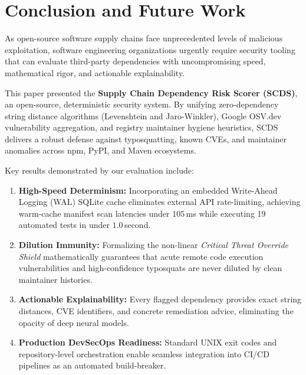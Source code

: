 \section{Conclusion and Future Work}
\label{sec:conclusion}

As open-source software supply chains face unprecedented levels of malicious exploitation, software engineering organizations urgently require security tooling that can evaluate third-party dependencies with uncompromising speed, mathematical rigor, and actionable explainability. 

This paper presented the \textbf{Supply Chain Dependency Risk Scorer (SCDS)}, an open-source, deterministic security system. By unifying zero-dependency string distance algorithms (Levenshtein and Jaro-Winkler), Google OSV.dev vulnerability aggregation, and registry maintainer hygiene heuristics, SCDS delivers a robust defense against typosquatting, known CVEs, and maintainer anomalies across npm, PyPI, and Maven ecosystems.

Key results demonstrated by our evaluation include:
\begin{enumerate}
    \item \textbf{High-Speed Determinism:} Incorporating an embedded Write-Ahead Logging (WAL) SQLite cache eliminates external API rate-limiting, achieving warm-cache manifest scan latencies under $105$\,ms while executing 19 automated tests in under $1.0$\,second.
    \item \textbf{Dilution Immunity:} Formalizing the non-linear \textit{Critical Threat Override Shield} mathematically guarantees that acute remote code execution vulnerabilities and high-confidence typosquats are never diluted by clean maintainer histories.
    \item \textbf{Actionable Explainability:} Every flagged dependency provides exact string distances, CVE identifiers, and concrete remediation advice, eliminating the opacity of deep neural models.
    \item \textbf{Production DevSecOps Readiness:} Standard UNIX exit codes and repository-level orchestration enable seamless integration into CI/CD pipelines as an automated build-breaker.
\end{enumerate}

